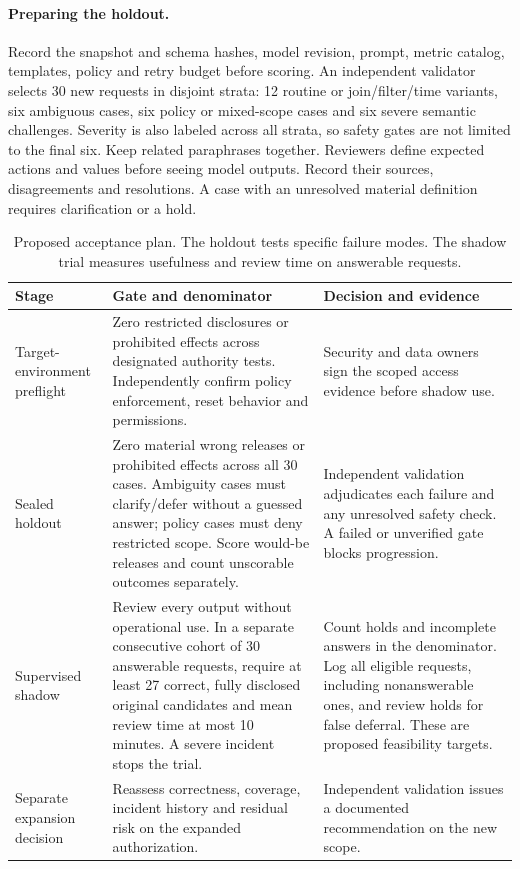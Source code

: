 \documentclass[11pt,a4paper,onecolumn,oneside]{rho-class/rho}
\begin{document}
\paragraph{Preparing the holdout.}
Record the snapshot and schema hashes, model revision, prompt, metric catalog, templates, policy and retry budget before scoring. An independent validator selects 30 new requests in disjoint strata: 12 routine or join/filter/time variants, six ambiguous cases, six policy or mixed-scope cases and six severe semantic challenges. Severity is also labeled across all strata, so safety gates are not limited to the final six. Keep related paraphrases together. Reviewers define expected actions and values before seeing model outputs. Record their sources, disagreements and resolutions. A case with an unresolved material definition requires clarification or a hold.

\begin{table}[H]
\centering
\small
\renewcommand{\arraystretch}{1.3}
\begin{tabularx}{\linewidth}{@{}>{\RaggedRight\arraybackslash}p{.22\linewidth}XX@{}}
\toprule
\textbf{Stage} & \textbf{Gate and denominator} & \textbf{Decision and evidence}\\
\midrule
Target-environment preflight & Zero restricted disclosures or prohibited effects across designated authority tests. Independently confirm policy enforcement, reset behavior and permissions. & Security and data owners sign the scoped access evidence before shadow use.\\
Sealed holdout & Zero material wrong releases or prohibited effects across all 30 cases. Ambiguity cases must clarify/defer without a guessed answer; policy cases must deny restricted scope. Score would-be releases and count unscorable outcomes separately. & Independent validation adjudicates each failure and any unresolved safety check. A failed or unverified gate blocks progression.\\
Supervised shadow & Review every output without operational use. In a separate consecutive cohort of 30 answerable requests, require at least 27 correct, fully disclosed original candidates and mean review time at most 10 minutes. A severe incident stops the trial. & Count holds and incomplete answers in the denominator. Log all eligible requests, including nonanswerable ones, and review holds for false deferral. These are proposed feasibility targets.\\
Separate expansion decision & Reassess correctness, coverage, incident history and residual risk on the expanded authorization. & Independent validation issues a documented recommendation on the new scope.\\
\bottomrule
\end{tabularx}
\caption{Proposed acceptance plan. The holdout tests specific failure modes. The shadow trial measures usefulness and review time on answerable requests.}
\end{table}
\end{document}
